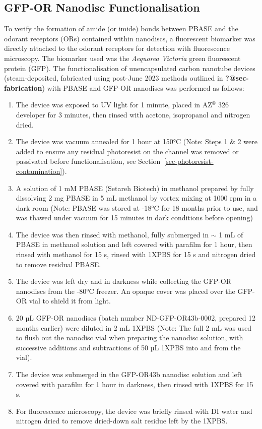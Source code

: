 \documentclass[
  a4paper,
]{scrbook}
\begin{document}
\hypertarget{sec-PBASE-GFP-OR-attachment}{%
\subsection{GFP-OR Nanodisc
Functionalisation}\label{sec-PBASE-GFP-OR-attachment}}

To verify the formation of amide (or imide) bonds between PBASE and the
odorant receptors (ORs) contained within nanodiscs, a fluorescent
biomarker was directly attached to the odorant receptors for detection
with fluorescence microscopy. The biomarker used was the \emph{Aequorea
Victoria} green fluorescent protein (GFP). The functionalisation of
unencapsulated carbon nanotube devices (steam-deposited, fabricated
using post-June 2023 methods outlined in \textbf{?@sec-fabrication})
with PBASE and GFP-OR nanodiscs was performed as follows:

\begin{enumerate}
\def\labelenumi{\arabic{enumi}.}
\item
  The device was exposed to UV light for 1 minute, placed in
  AZ\(^\circledR\) 326 developer for 3 minutes, then rinsed with
  acetone, isopropanol and nitrogen dried.
\item
  The device was vacuum annealed for 1 hour at 150°C (Note: Steps 1 \& 2
  were added to ensure any residual photoresist on the channel was
  removed or passivated before functionalisation, see
  Section~\ref{sec-photoresist-contamination}).
\item
  A solution of 1 mM PBASE (Setareh Biotech) in methanol prepared by
  fully dissolving 2 mg PBASE in 5 mL methanol by vortex mixing at 1000
  rpm in a dark room (Note: PBASE was stored at -18°C for 18 months
  prior to use, and was thawed under vacuum for 15 minutes in dark
  conditions before opening)
\item
  The device was then rinsed with methanol, fully submerged in \(\sim\)
  1 mL of PBASE in methanol solution and left covered with parafilm for
  1 hour, then rinsed with methanol for 15 s, rinsed with 1XPBS for 15 s
  and nitrogen dried to remove residual PBASE.
\item
  The device was left dry and in darkness while collecting the GFP-OR
  nanodiscs from the -80°C freezer. An opaque cover was placed over the
  GFP-OR vial to shield it from light.
\item
  20 µL GFP-OR nanodiscs (batch number ND-GFP-OR43b-0002, prepared 12
  months earlier) were diluted in 2 mL 1XPBS (Note: The full 2 mL was
  used to flush out the nanodisc vial when preparing the nanodisc
  solution, with successive additions and subtractions of 50 µL 1XPBS
  into and from the vial).
\item
  The device was submerged in the GFP-OR43b nanodisc solution and left
  covered with parafilm for 1 hour in darkness, then rinsed with 1XPBS
  for 15 s.
\item
  For fluorescence microscopy, the device was briefly rinsed with DI
  water and nitrogen dried to remove dried-down salt residue left by the
  1XPBS.
\end{enumerate}
\end{document}
